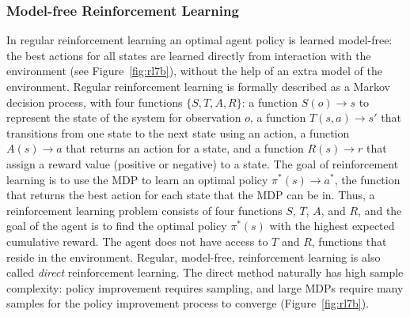 \subsubsection{Model-free Reinforcement Learning}
In regular reinforcement learning an optimal agent policy  is learned model-free: the best actions for all states are learned directly from interaction with the environment (see Figure~\ref{fig:rl7b}), without the help of an extra model of the environment. Regular reinforcement learning is formally described as a Markov decision process, with four functions $\{S, T, A, R\}$: a function $S(o)\rightarrow s$ to represent the state of the system for observation $o$, a function $T(s,a)\rightarrow s'$ that transitions from one state to the next state using an action, a function $A(s)\rightarrow a$ that returns an action for a state, and a function $R(s)\rightarrow r$ that assign a reward value (positive or negative) to a state. The goal of reinforcement learning is to use the MDP to learn an optimal policy $\pi^*(s)\rightarrow a^*$, the function that returns the best action for each state that the MDP can be in. Thus, a reinforcement learning problem consists of four functions $S$, $T$, $A$, and $R$, and the goal of the agent is to find the optimal policy $\pi^*(s)$ with the highest expected cumulative reward. The agent does not have access to $T$ and $R$, functions that reside in the environment. %
Regular, model-free, reinforcement learning is also called {\em direct} reinforcement learning. %
The direct method naturally has high sample complexity: policy improvement requires sampling, and large MDPs require many samples for the policy improvement process to converge (Figure~\ref{fig:rl7b}). 


